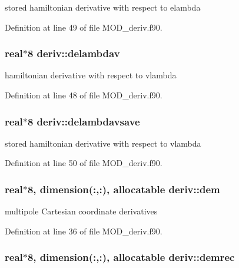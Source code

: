 stored hamiltonian derivative with respect to elambda 



Definition at line 49 of file M\-O\-D\-\_\-deriv.\-f90.

\hypertarget{classderiv_ad4e8728a9503b786c371e81cbf1948ca}{
\subsubsection[{delambdav}]{\setlength{\rightskip}{0pt plus 5cm}real$\ast$8 deriv\-::delambdav}}\label{classderiv_ad4e8728a9503b786c371e81cbf1948ca}


hamiltonian derivative with respect to vlambda 



Definition at line 48 of file M\-O\-D\-\_\-deriv.\-f90.

\hypertarget{classderiv_a80f5ce711443744988b4cb3dd1f563d0}{
\subsubsection[{delambdavsave}]{\setlength{\rightskip}{0pt plus 5cm}real$\ast$8 deriv\-::delambdavsave}}\label{classderiv_a80f5ce711443744988b4cb3dd1f563d0}


stored hamiltonian derivative with respect to vlambda 



Definition at line 50 of file M\-O\-D\-\_\-deriv.\-f90.

\hypertarget{classderiv_af6b4f5f648a769701a0accf5b8c0a49a}{
\subsubsection[{dem}]{\setlength{\rightskip}{0pt plus 5cm}real$\ast$8, dimension(\-:,\-:), allocatable deriv\-::dem}}\label{classderiv_af6b4f5f648a769701a0accf5b8c0a49a}


multipole Cartesian coordinate derivatives 



Definition at line 36 of file M\-O\-D\-\_\-deriv.\-f90.

\hypertarget{classderiv_a43a2a9492e8d05870a46581134371eac}{
\subsubsection[{demrec}]{\setlength{\rightskip}{0pt plus 5cm}real$\ast$8, dimension(\-:,\-:), allocatable deriv\-::demrec}}\label{classderiv_a43a2a9492e8d05870a46581134371eac}


